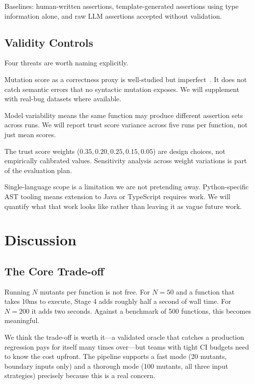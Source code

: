 \documentclass[conference]{IEEEtran}
\begin{document}
Baselines: human-written assertions, template-generated assertions using type information alone, and raw LLM assertions accepted without validation.

\subsection{Validity Controls}

Four threats are worth naming explicitly.

Mutation score as a correctness proxy is well-studied but imperfect~\cite{jia2011mutation}. It does not catch semantic errors that no syntactic mutation exposes. We will supplement with real-bug datasets where available.

Model variability means the same function may produce different assertion sets across runs. We will report trust score variance across five runs per function, not just mean scores.

The trust score weights ($0.35, 0.20, 0.25, 0.15, 0.05$) are design choices, not empirically calibrated values. Sensitivity analysis across weight variations is part of the evaluation plan.

Single-language scope is a limitation we are not pretending away. Python-specific AST tooling means extension to Java or TypeScript requires work. We will quantify what that work looks like rather than leaving it as vague future work.

\section{Discussion}

\subsection{The Core Trade-off}

Running $N$ mutants per function is not free. For $N=50$ and a function that takes 10ms to execute, Stage 4 adds roughly half a second of wall time. For $N=200$ it adds two seconds. Against a benchmark of 500 functions, this becomes meaningful.

We think the trade-off is worth it—a validated oracle that catches a production regression pays for itself many times over—but teams with tight CI budgets need to know the cost upfront. The pipeline supports a fast mode (20 mutants, boundary inputs only) and a thorough mode (100 mutants, all three input strategies) precisely because this is a real concern.
\end{document}
